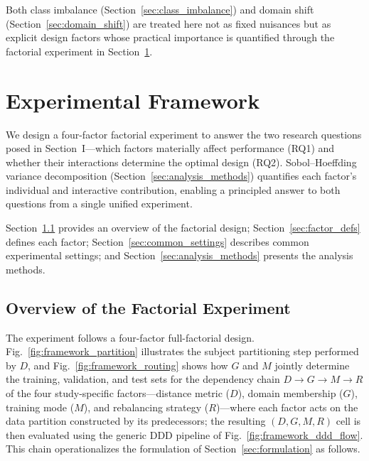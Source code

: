 \documentclass[lettersize,journal]{IEEEtran}
\begin{document}
Both class imbalance (Section~\ref{sec:class_imbalance}) and domain shift (Section~\ref{sec:domain_shift}) are treated here not as fixed nuisances but as explicit design factors whose practical importance is quantified through the factorial experiment in Section~\ref{sec:framework}.

\section{Experimental Framework}
\label{sec:framework}

We design a four-factor factorial experiment to answer the two research questions posed in Section~I---which factors materially affect performance (RQ1) and whether their interactions determine the optimal design (RQ2).
Sobol--Hoeffding variance decomposition (Section~\ref{sec:analysis_methods}) quantifies each factor's individual and interactive contribution, enabling a principled answer to both questions from a single unified experiment.

Section~\ref{sec:design_overview} provides an overview of the factorial design; Section~\ref{sec:factor_defs} defines each factor; Section~\ref{sec:common_settings} describes common experimental settings; and Section~\ref{sec:analysis_methods} presents the analysis methods.

\subsection{Overview of the Factorial Experiment}\label{sec:design_overview}
The experiment follows a four-factor full-factorial design.
Fig.~\ref{fig:framework_partition} illustrates the subject partitioning step performed by $D$, and Fig.~\ref{fig:framework_routing} shows how $G$ and $M$ jointly determine the training, validation, and test sets for the dependency chain $D \to G \to M \to R$ of the four study-specific factors---distance metric ($D$), domain membership ($G$), training mode ($M$), and rebalancing strategy ($R$)---where each factor acts on the data partition constructed by its predecessors; the resulting $(D, G, M, R)$ cell is then evaluated using the generic DDD pipeline of Fig.~\ref{fig:framework_ddd_flow}. This chain operationalizes the formulation of Section~\ref{sec:formulation} as follows.
\end{document}
